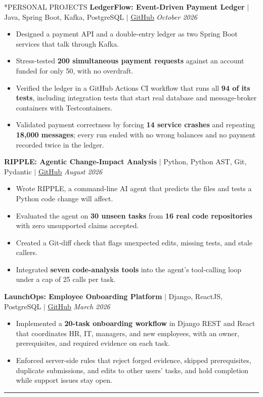 \documentclass[10pt, letterpaper]{article}
\makeatletter
\newcommand{\sectiondivider}{\vspace{0.46em}\hrule\vspace{0.43em}}
\newcommand{\rolegap}{\vspace{5.2pt}}
\renewcommand{\section}{\@startsection{section}{1}{\z@}{-0.36em \@plus -0.1ex \@minus -0.1ex}{0.26ex \@plus 0.1ex}{\normalfont\large\bfseries}}
\makeatother
\begin{document}
\section*{PERSONAL PROJECTS}
\noindent\textbf{LedgerFlow: Event-Driven Payment Ledger} $|$ Java, Spring Boot, Kafka, PostgreSQL $|$ \href{https://github.com/Jaypath456/ledgerFlow}{\underline{GitHub}} \hfill \textit{October 2026}
\begin{itemize}\setlength{\itemsep}{0.48pt}
\item Designed a payment API and a double-entry ledger as two Spring Boot services that talk through Kafka.
\item Stress-tested \textbf{200 simultaneous payment requests} against an account funded for only 50, with no overdraft.
\item Verified the ledger in a GitHub Actions CI workflow that runs all \textbf{94 of its tests}, including integration tests that start real database and message-broker containers with Testcontainers.
\item Validated payment correctness by forcing \textbf{14 service crashes} and repeating \textbf{18,000 messages}; every run ended with no wrong balances and no payment recorded twice in the ledger.
\end{itemize}
\rolegap
\noindent\textbf{RIPPLE: Agentic Change-Impact Analysis} $|$ Python, Python AST, Git, Pydantic $|$ \href{https://github.com/Jaypath456/ripple}{\underline{GitHub}} \hfill \textit{August 2026}
\begin{itemize}\setlength{\itemsep}{0.48pt}
\item Wrote RIPPLE, a command-line AI agent that predicts the files and tests a Python code change will affect.
\item Evaluated the agent on \textbf{30 unseen tasks} from \textbf{16 real code repositories} with zero unsupported claims accepted.
\item Created a Git-diff check that flags unexpected edits, missing tests, and stale callers.
\item Integrated \textbf{seven code-analysis tools} into the agent's tool-calling loop under a cap of 25 calls per task.
\end{itemize}
\rolegap
\noindent\textbf{LaunchOps: Employee Onboarding Platform} $|$ Django, ReactJS, PostgreSQL $|$ \href{https://github.com/Jaypath456/LaunchOps}{\underline{GitHub}} \hfill \textit{March 2026}
\begin{itemize}\setlength{\itemsep}{0.48pt}
\item Implemented a \textbf{20-task onboarding workflow} in Django REST and React that coordinates HR, IT, managers, and new employees, with an owner, prerequisites, and required evidence on each task.
\item Enforced server-side rules that reject forged evidence, skipped prerequisites, duplicate submissions, and edits to other users' tasks, and hold completion while support issues stay open.
\end{itemize}
\sectiondivider
\end{document}
